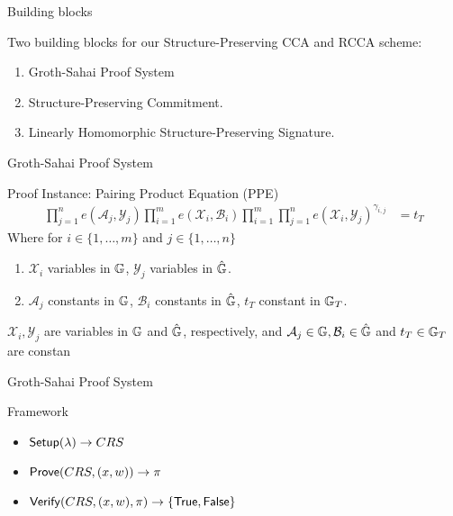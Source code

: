 
\begin{frame}{Building blocks}
  \begin{block}{Two building blocks for our Structure-Preserving CCA and RCCA scheme:}
    \begin{enumerate}
    \item Groth-Sahai Proof System 
    \item Structure-Preserving Commitment.
    \item Linearly Homomorphic Structure-Preserving Signature.
    \end{enumerate}
  \end{block}
\end{frame}


\begin{frame}{Groth-Sahai Proof System}
  \begin{block}{Proof Instance: Pairing Product Equation (PPE)}
    \begin{align*}
      \prod^{n}_{j=1} e(\mathcal{A}_j, \mathcal{Y}_j) \prod^{m}_{i=1}e(\mathcal{X}_i, \mathcal{B}_i)\prod^{m}_{i=1} \prod^{n}_{j=1}e(\mathcal{X}_i, \mathcal{Y}_j)^{\gamma_{i,j}} &= t_T
    \end{align*}
    Where for $i \in \{1, \dots, m\}$ and $j \in \{1, \dots, n\}$
    \begin{enumerate}
    \item $\mathcal{X}_i$ variables in $\mathbb{G}$, $\mathcal{Y}_j$ variables in $\hat{\mathbb{G}}$.
    \item $\mathcal{A}_j$ constants in $\mathbb{G}$, $\mathcal{B}_i$ constants in $\hat{\mathbb{G}}$, $t_T$ constant in $\mathbb{G}_T$.
    \end{enumerate}
    $\mathcal{X}_i, \mathcal{Y}_j$ are variables in $\mathbb{G}$ and $\hat{\mathbb{G}}$, respectively, and $\mathcal{A}_j \in \mathbb{G}, \mathcal{B}_i \in \hat{\mathbb{G}}$ and $t_T \in \mathbb{G}_T$ are constan
  \end{block}
  
\end{frame}

\begin{frame}{Groth-Sahai Proof System}
  \begin{block}{Framework}
    \begin{itemize}
    \item ${\mathsf{Setup}}(\lambda) \to CRS$
    \item ${\mathsf{Prove}}(CRS, (x, w)) \to \pi$
    \item ${\mathsf{Verify}}(CRS, (x,w), \pi) \to \{\mathsf{True}, \mathsf{False}\}$
    \end{itemize}
  \end{block}
\end{frame}





